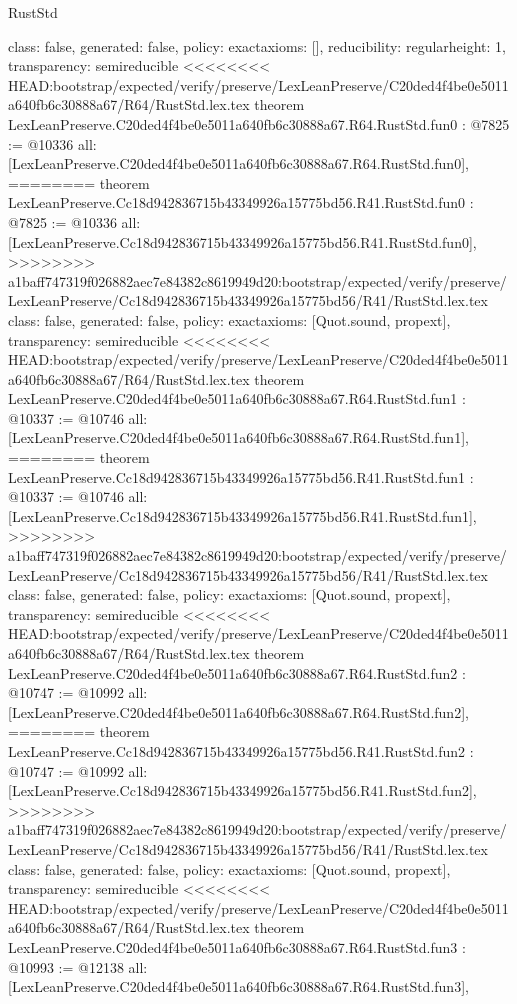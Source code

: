 \begin{lexlean}{RustStd}
\begin{coremodule}
{\begin{coremodule}
{{{  class: false,
  generated: false,
  policy: exact{axioms: []},
  reducibility: regular{height: 1},
  transparency: semireducible
}
<<<<<<<< HEAD:bootstrap/expected/verify/preserve/LexLeanPreserve/C20ded4f4be0e5011a640fb6c30888a67/R64/RustStd.lex.tex
theorem LexLeanPreserve.C20ded4f4be0e5011a640fb6c30888a67.R64.RustStd.fun0 : @7825 := @10336 {
  all: [LexLeanPreserve.C20ded4f4be0e5011a640fb6c30888a67.R64.RustStd.fun0],
========
theorem LexLeanPreserve.Cc18d942836715b43349926a15775bd56.R41.RustStd.fun0 : @7825 := @10336 {
  all: [LexLeanPreserve.Cc18d942836715b43349926a15775bd56.R41.RustStd.fun0],
>>>>>>>> a1baff747319f026882aec7e84382c8619949d20:bootstrap/expected/verify/preserve/LexLeanPreserve/Cc18d942836715b43349926a15775bd56/R41/RustStd.lex.tex
  class: false,
  generated: false,
  policy: exact{axioms: [Quot.sound, propext]},
  transparency: semireducible
}
<<<<<<<< HEAD:bootstrap/expected/verify/preserve/LexLeanPreserve/C20ded4f4be0e5011a640fb6c30888a67/R64/RustStd.lex.tex
theorem LexLeanPreserve.C20ded4f4be0e5011a640fb6c30888a67.R64.RustStd.fun1 : @10337 := @10746 {
  all: [LexLeanPreserve.C20ded4f4be0e5011a640fb6c30888a67.R64.RustStd.fun1],
========
theorem LexLeanPreserve.Cc18d942836715b43349926a15775bd56.R41.RustStd.fun1 : @10337 := @10746 {
  all: [LexLeanPreserve.Cc18d942836715b43349926a15775bd56.R41.RustStd.fun1],
>>>>>>>> a1baff747319f026882aec7e84382c8619949d20:bootstrap/expected/verify/preserve/LexLeanPreserve/Cc18d942836715b43349926a15775bd56/R41/RustStd.lex.tex
  class: false,
  generated: false,
  policy: exact{axioms: [Quot.sound, propext]},
  transparency: semireducible
}
<<<<<<<< HEAD:bootstrap/expected/verify/preserve/LexLeanPreserve/C20ded4f4be0e5011a640fb6c30888a67/R64/RustStd.lex.tex
theorem LexLeanPreserve.C20ded4f4be0e5011a640fb6c30888a67.R64.RustStd.fun2 : @10747 := @10992 {
  all: [LexLeanPreserve.C20ded4f4be0e5011a640fb6c30888a67.R64.RustStd.fun2],
========
theorem LexLeanPreserve.Cc18d942836715b43349926a15775bd56.R41.RustStd.fun2 : @10747 := @10992 {
  all: [LexLeanPreserve.Cc18d942836715b43349926a15775bd56.R41.RustStd.fun2],
>>>>>>>> a1baff747319f026882aec7e84382c8619949d20:bootstrap/expected/verify/preserve/LexLeanPreserve/Cc18d942836715b43349926a15775bd56/R41/RustStd.lex.tex
  class: false,
  generated: false,
  policy: exact{axioms: [Quot.sound, propext]},
  transparency: semireducible
}
<<<<<<<< HEAD:bootstrap/expected/verify/preserve/LexLeanPreserve/C20ded4f4be0e5011a640fb6c30888a67/R64/RustStd.lex.tex
theorem LexLeanPreserve.C20ded4f4be0e5011a640fb6c30888a67.R64.RustStd.fun3 : @10993 := @12138 {
  all: [LexLeanPreserve.C20ded4f4be0e5011a640fb6c30888a67.R64.RustStd.fun3],
}}}}}}
\end{coremodule}}
\end{coremodule}
\end{lexlean}
